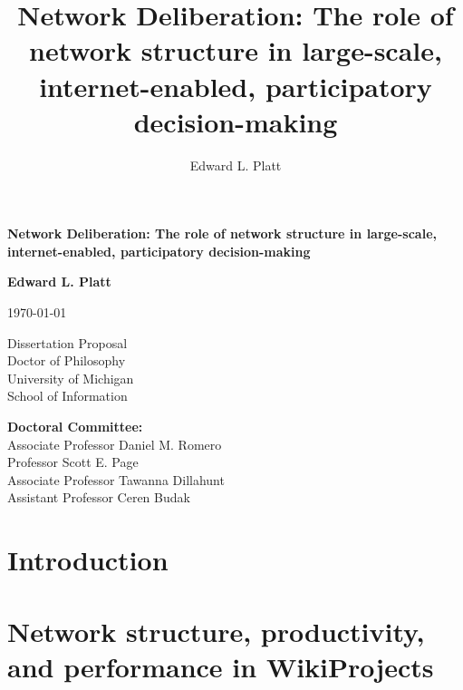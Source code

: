 \documentclass{report}
\author{Edward L. Platt}
\title{Network Deliberation: The role of network structure in large-scale, internet-enabled, participatory decision-making}
\newcommand{\+}{\phantom{-}}
\begin{document}
\begin{titlepage}
   \begin{center}
       \vspace*{1cm}

       \textbf{\Large Network Deliberation: The role of network structure in large-scale, internet-enabled, participatory decision-making}        
            
       \vspace{1.5cm}

       \textbf{Edward L. Platt}
       
       \today

       \vfill
            
       Dissertation Proposal\\
       Doctor of Philosophy \\
       University of Michigan \\
       School of Information
            
       \vspace{0.8cm}
     
            
   \end{center}
    {\bfseries Doctoral Committee:}\\
    Associate Professor Daniel M. Romero \\
    Professor Scott E. Page \\
    Associate Professor Tawanna Dillahunt \\
    Assistant Professor Ceren Budak
         
\end{titlepage}

%

\tableofcontents

\listoffigures
\listoftables

\chapter{Introduction}
\label{chap:intro}


\chapter{Network structure, productivity, and performance in WikiProjects}
\label{chap:wp-prod-perf}

\end{document}
